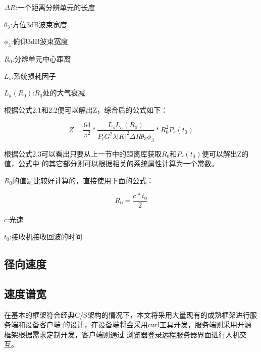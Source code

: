 \documentclass[a4paper,12pt]{report}
\begin{document}
\begin{spacing}{1.5}
\begin{proposition}[体散射雷达方程]
    $\Delta R$:一个距离分辨单元的长度

    $\theta_3$:方位3dB波束宽度

    $\phi_3$:俯仰3dB波束宽度

    $R_0$:分辨单元中心距离

    $L_s$:系统损耗因子

    $L_a(R_0)$:$R_0$处的大气衰减
\end{proposition}

根据公式2.1和2.2便可以解出Z，综合后的公式如下：
\begin{proposition}[体散射雷达方程]

    \begin{equation}
        Z=\frac{64}{\pi^2}*\frac{L_sL_a\left(R_0\right)}
            {P_tG^2\lambda|K|^2\Delta R\theta_3\phi_3}*R_0^2P_r(t_0)
    \end{equation}

\end{proposition}

根据公式2.3可以看出只要从上一节中的距离库获取$R_0$和$P_r(t_0)$便可以解出Z的值，公式中
的其它部分则可以根据相关的系统属性计算为一个常数。

$R_0$的值是比较好计算的，直接使用下面的公式：
\begin{proposition}[目标距离计算]

    \begin{equation}
        R_0=\frac{c*t_0}{2} 
    \end{equation}

    $c$:光速

    $t_0$:接收机接收回波的时间

\end{proposition}



\subsection{径向速度}

\subsection{速度谱宽}



在基本的框架符合经典C/S架构的情况下，本文将采用大量现有的成熟框架进行服务端和设备客户端
的设计，在设备端将会采用curl工具开发，服务端则采用开源框架根据需求定制开发，客户端则通过
浏览器登录远程服务器界面进行人机交互。

\end{spacing}
\end{document}
